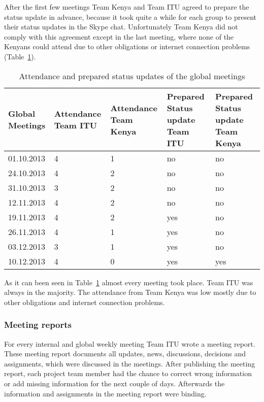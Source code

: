 After the first few meetings Team Kenya and Team ITU agreed to prepare the status update in advance, because it took quite a while for each group to present their status updates in the Skype chat. Unfortunately Team Kenya did not comply with this agreement except in the last meeting, where none of the Kenyans could attend due to other obligations or internet connection problems (Table~\ref{tab:global_meetings}).

\begin{table}[htb]
	\centering
	\begin{tabular}{ | l |  p{2.5cm} |  p{2.5cm} |  p{3cm} |  p{3cm} |}
    		\hline
   		Global Meetings & Attendance Team ITU &  Attendance Team Kenya & Prepared Status update Team ITU & Prepared Status update Team Kenya\\ \hline
    		01.10.2013 & 4 & 1 & no & no \\ \hline
    		24.10.2013 & 4 & 2 & no & no \\ \hline
    		31.10.2013 & 3 & 2 & no & no \\ \hline
    		12.11.2013 & 4 & 2 & no & no \\ \hline
    		19.11.2013 & 4 & 2 & yes & no \\ \hline
    		26.11.2013 & 4 & 1 & yes & no \\ \hline
    		03.12.2013 & 3 & 1 & yes & no \\ \hline
    		10.12.2013 & 4 & 0 & yes & yes \\ \hline
	\end{tabular}
	\caption{Attendance and prepared status updates of the global meetings}
	\label{tab:global_meetings}
\end{table}

As it can been seen in Table~\ref{tab:global_meetings} almost every meeting took place. Team ITU was always in the majority. The attendance from Team Kenya was low mostly due to other obligations and internet connection problems.

\subsubsection {Meeting reports}

For every internal and global weekly meeting Team ITU wrote a meeting report. These meeting report documents all updates, news, discussions, decisions and assignments, which were discussed in the meetings. After publishing the meeting report, each project team member had the chance to correct wrong information or add missing information for the next couple of days. Afterwards the information and assignments in the meeting report were binding.

